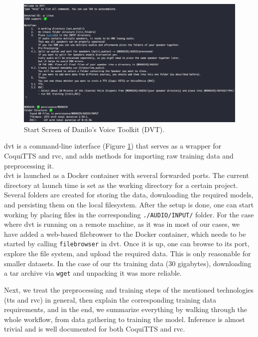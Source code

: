 \documentclass[
  a4paper,  %
  twoside,  %
  bibliography=totoc,
  headsepline,
  cleardoublepage=empty,
  parskip=half,
  draft=false
]{scrbook}
\begin{document}
\begin{figure}[h]
  \centering
  \includegraphics[width=1\textwidth]{./graphics/dvt-screen.png}
  \caption{Start Screen of Danilo's Voice Toolkit (DVT).}
  \label{fig:dvt-interface}
\end{figure}

\gls{dvt} is a command-line interface (Figure \ref{fig:dvt-interface}) that serves as a wrapper for CoquiTTS and \gls{rvc}, and adds methods for importing raw training data and preprocessing it. \\
\gls{dvt} is launched as a Docker container with several forwarded ports. The current directory at launch time is set as the working directory for a certain project. Several folders are created for storing the data, downloading the required models, and persisting them on the local filesystem. After the setup is done, one can start working by placing files in the corresponding \verb|./AUDIO/INPUT/| folder. For the case where \gls{dvt} is running on a remote machine, as it was in most of our cases, we have added a web-based filebrowser to the Docker container, which needs to be started by calling \verb|filebrowser| in \gls{dvt}. Once it is up, one can browse to its port, explore the file system, and upload the required data. This is only reasonable for smaller datasets. In the case of our \gls{tts} training data (30 gigabytes), downloading a tar archive via \verb|wget| and unpacking it was more reliable. 

Next, we treat the preprocessing and training steps of the mentioned technologies (\gls{tts} and \gls{rvc}) in general, then explain the corresponding training data requirements, and in the end, we summarize everything by walking through the whole workflow, from data gathering to training the model. Inference is almost trivial and is well documented for both CoquiTTS and \gls{rvc}.
\end{document}

